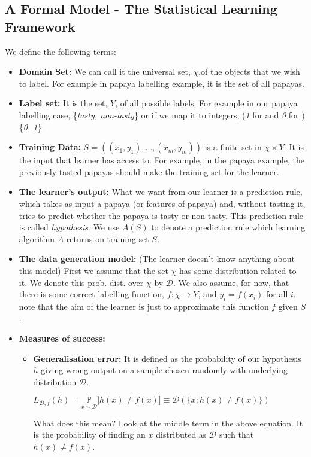 \documentclass[a4paper]{article}
\begin{document}
\subsection{A Formal Model - The Statistical Learning Framework}
We define the following terms:
\begin{itemize}
    \item \textbf{Domain Set:} We can call it the universal set, $\chi$,of the objects that we wish to label. For example in papaya labelling example, it is the set of all papayas.
    \item \textbf{Label set: } It is the set, $Y$, of all possible labels. For example in our papaya labelling case, \{\textit{tasty, non-tasty}\} or if we map it to integers, (\textit{1} for  and \textit{0} for ) \{\textit{0, 1}\}.
    \item \textbf{Training Data: } $S = ((x_1, y_1),...,(x_m,y_m))$ is a finite set in $\chi \times Y$. It is the input that learner has access to. For example, in the papaya example, the previously tasted papayas should make the training set for the learner.
    \item \textbf{The learner's output: } What we want from our learner is a prediction rule, which takes as input a papaya (or features of papaya) and, without tasting it, tries to predict whether the papaya is tasty or non-tasty. This prediction rule is called \textit{hypothesis}. We use $A(S)$ to denote a prediction rule which learning algorithm $A$ returns on training set $S$.
    \item \textbf{The data generation model: } (The learner doesn't know anything about this model) First we assume that the set $\chi$ has some distribution related to it. We denote this prob. dist. over $\chi$ by $\mathcal{D}$. We also assume, for now, that there is some correct labelling function, $f: \chi \to Y$, and $y_i = f(x_i)$ for all $i$. note that the aim of the learner is just to approximate this function $f$ given $S$.
    \item \textbf{Measures of success: } 
        \begin{itemize}
            \item \textbf{Generalisation error: } It is defined as the probability of our hypothesis $h$ giving wrong output on a sample chosen randomly with underlying distribution $\mathcal{D}$.
                \begin{center}
                                    $L_{\mathcal{D},f}(h) = \underset{x\sim\mathcal{D}}{\mathbb{P}}]h(x) \neq f(x)] \equiv \mathcal{D}(\{x:h(x) \neq f(x)\})$
                \end{center}
            What does this mean? Look at the middle term in the above equation. It is the probability of finding an $x$ distributed as $\mathcal{D}$ such that $h(x) \neq f(x)$.
                

\end{itemize}
\end{itemize}
\end{document}
